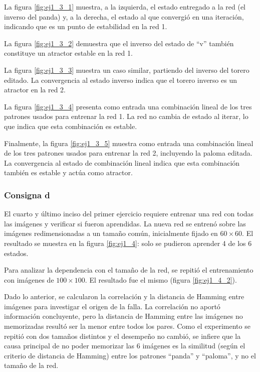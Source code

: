 \documentclass[11pt]{article} %
\begin{document}
La figura \ref{fig:ej1_3_1} muestra, a la izquierda, el estado entregado a la red (el inverso del panda) y, a la derecha, el estado al que convergió en una iteración, indicando que es un punto de estabilidad en la red 1.  

La figura \ref{fig:ej1_3_2} demuestra que el inverso del estado de ``v'' también constituye un atractor estable en la red 1.  

La figura \ref{fig:ej1_3_3} muestra un caso similar, partiendo del inverso del torero editado. La convergencia al estado inverso indica que el torero inverso es un atractor en la red 2.  

La figura \ref{fig:ej1_3_4} presenta como entrada una combinación lineal de los tres patrones usados para entrenar la red 1. La red no cambia de estado al iterar, lo que indica que esta combinación es estable.  

Finalmente, la figura \ref{fig:ej1_3_5} muestra como entrada una combinación lineal de los tres patrones usados para entrenar la red 2, incluyendo la paloma editada. La convergencia al estado de combinación lineal indica que esta combinación también es estable y actúa como atractor.


\subsubsection{Consigna d}
El cuarto y último inciso del primer ejercicio requiere entrenar una red con todas las imágenes y verificar si fueron aprendidas. La nueva red se entrenó sobre las imágenes redimensionadas a un tamaño común, inicialmente fijado en $60 \times 60$. El resultado se muestra en la figura \ref{fig:ej1_4}: solo se pudieron aprender 4 de los 6 estados.

Para analizar la dependencia con el tamaño de la red, se repitió el entrenamiento con imágenes de $100 \times 100$. El resultado fue el mismo (figura \ref{fig:ej1_4_2}).

Dado lo anterior, se calcularon la correlación y la distancia de Hamming entre imágenes para investigar el origen de la falla. La correlación no aportó información concluyente, pero la distancia de Hamming entre las imágenes no memorizadas resultó ser la menor entre todos los pares. Como el experimento se repitió con dos tamaños distintos y el desempeño no cambió, se infiere que la causa principal de no poder memorizar las 6 imágenes es la similitud (según el criterio de distancia de Hamming) entre los patrones ``panda'' y ``paloma'', y no el tamaño de la red.
\end{document}
